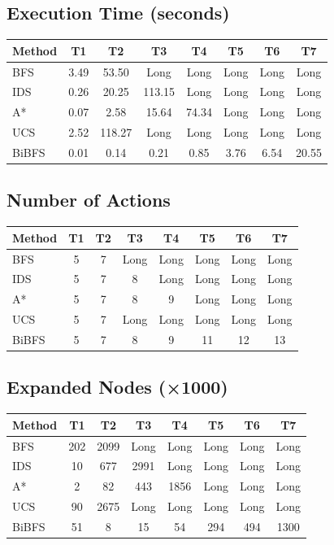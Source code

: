 \documentclass[12pt]{article}
\begin{document}
\subsection{Execution Time (seconds)}
\begin{longtable}{lccccccc}
\toprule
Method & T1 & T2 & T3 & T4 & T5 & T6 & T7 \\
\midrule
BFS   & 3.49 & 53.50 & Long & Long & Long & Long & Long \\
IDS   & 0.26 & 20.25 & 113.15 & Long & Long & Long & Long \\
A*    & 0.07 & 2.58 & 15.64 & 74.34 & Long & Long & Long \\
UCS   & 2.52 & 118.27 & Long & Long & Long & Long & Long \\
BiBFS & 0.01 & 0.14 & 0.21 & 0.85 & 3.76 & 6.54 & 20.55 \\
\bottomrule
\end{longtable}

\subsection{Number of Actions}
\begin{longtable}{lccccccc}
\toprule
Method & T1 & T2 & T3 & T4 & T5 & T6 & T7 \\
\midrule
BFS   & 5 & 7 & Long & Long & Long & Long & Long \\
IDS   & 5 & 7 & 8 & Long & Long & Long & Long \\
A*    & 5 & 7 & 8 & 9 & Long & Long & Long \\
UCS   & 5 & 7 & Long & Long & Long & Long & Long \\
BiBFS & 5 & 7 & 8 & 9 & 11 & 12 & 13 \\
\bottomrule
\end{longtable}

\subsection{Expanded Nodes (×1000)}
\begin{longtable}{lccccccc}
\toprule
Method & T1 & T2 & T3 & T4 & T5 & T6 & T7 \\
\midrule
BFS   & 202 & 2099 & Long & Long & Long & Long & Long \\
IDS   & 10 & 677 & 2991 & Long & Long & Long & Long \\
A*    & 2 & 82 & 443 & 1856 & Long & Long & Long \\
UCS   & 90 & 2675 & Long & Long & Long & Long & Long \\
BiBFS & 51 & 8 & 15 & 54 & 294 & 494 & 1300 \\
\bottomrule
\end{longtable}
\end{document}
